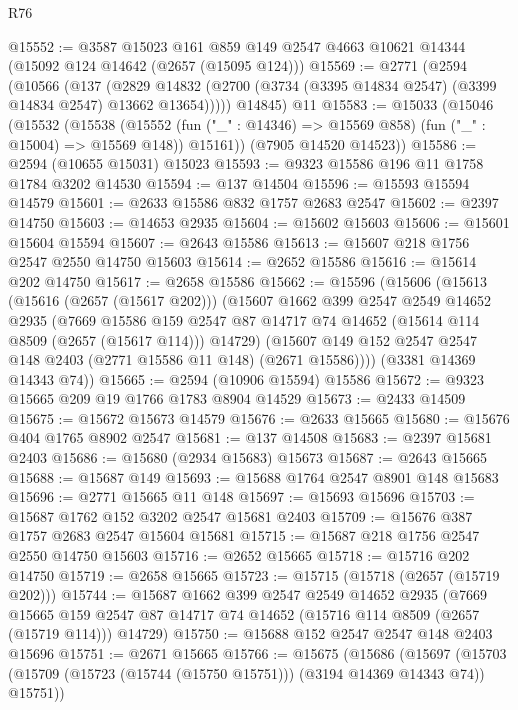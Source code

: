 \begin{lexlean}{R76}
\begin{coremodule}
@15552 := @3587
    @15023
    @161
    @859
    @149
    @2547
    @4663
    @10621
    @14344
    (@15092 @124 @14642 (@2657 (@15095 @124)))
@15569 := @2771
    (@2594
      (@10566
        (@137
          (@2829 @14832 (@2700 (@3734 (@3395 @14834 @2547) (@3399 @14834 @2547) @13662 @13654)))))
      @14845)
    @11
@15583 := @15033
    (@15046
      (@15532
        (@15538
          (@15552 (fun ("_" : @14346) => @15569 @858) (fun ("_" : @15004) => @15569 @148))
          @15161))
      (@7905 @14520 @14523))
@15586 := @2594 (@10655 @15031) @15023
@15593 := @9323 @15586 @196 @11 @1758 @1784 @3202 @14530
@15594 := @137 @14504
@15596 := @15593 @15594 @14579
@15601 := @2633 @15586 @832 @1757 @2683 @2547
@15602 := @2397 @14750
@15603 := @14653 @2935
@15604 := @15602 @15603
@15606 := @15601 @15604 @15594
@15607 := @2643 @15586
@15613 := @15607 @218 @1756 @2547 @2550 @14750 @15603
@15614 := @2652 @15586
@15616 := @15614 @202 @14750
@15617 := @2658 @15586
@15662 := @15596
    (@15606
      (@15613
        (@15616 (@2657 (@15617 @202)))
        (@15607
          @1662
          @399
          @2547
          @2549
          @14652
          @2935
          (@7669
            @15586
            @159
            @2547
            @87
            @14717
            @74
            @14652
            (@15614 @114 @8509 (@2657 (@15617 @114)))
            @14729)
          (@15607 @149 @152 @2547 @2547 @148 @2403 (@2771 @15586 @11 @148) (@2671 @15586))))
      (@3381 @14369 @14343 @74))
@15665 := @2594 (@10906 @15594) @15586
@15672 := @9323 @15665 @209 @19 @1766 @1783 @8904 @14529
@15673 := @2433 @14509
@15675 := @15672 @15673 @14579
@15676 := @2633 @15665
@15680 := @15676 @404 @1765 @8902 @2547
@15681 := @137 @14508
@15683 := @2397 @15681 @2403
@15686 := @15680 (@2934 @15683) @15673
@15687 := @2643 @15665
@15688 := @15687 @149
@15693 := @15688 @1764 @2547 @8901 @148 @15683
@15696 := @2771 @15665 @11 @148
@15697 := @15693 @15696
@15703 := @15687 @1762 @152 @3202 @2547 @15681 @2403
@15709 := @15676 @387 @1757 @2683 @2547 @15604 @15681
@15715 := @15687 @218 @1756 @2547 @2550 @14750 @15603
@15716 := @2652 @15665
@15718 := @15716 @202 @14750
@15719 := @2658 @15665
@15723 := @15715 (@15718 (@2657 (@15719 @202)))
@15744 := @15687
    @1662
    @399
    @2547
    @2549
    @14652
    @2935
    (@7669 @15665 @159 @2547 @87 @14717 @74 @14652 (@15716 @114 @8509 (@2657 (@15719 @114))) @14729)
@15750 := @15688 @152 @2547 @2547 @148 @2403 @15696
@15751 := @2671 @15665
@15766 := @15675
    (@15686
      (@15697 (@15703 (@15709 (@15723 (@15744 (@15750 @15751))) (@3194 @14369 @14343 @74)) @15751))

\end{coremodule}
\end{lexlean}
